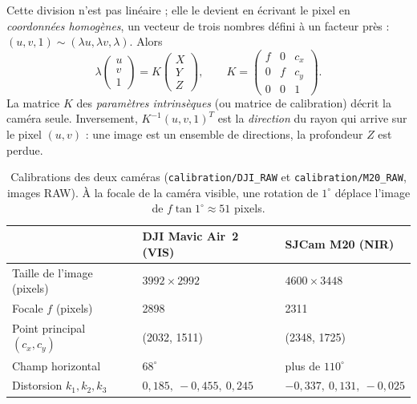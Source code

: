 \documentclass[a4paper,11pt]{report}
\begin{document}
Cette division n'est pas linéaire ; elle le devient en écrivant le pixel en \emph{coordonnées homogènes}, un vecteur de trois nombres défini à un facteur près : $(u, v, 1) \sim (\lambda u, \lambda v, \lambda)$. Alors
\begin{equation}\label{eq:ann_pinhole}
	\lambda \begin{pmatrix} u \\ v \\ 1 \end{pmatrix} = K \begin{pmatrix} X \\ Y \\ Z \end{pmatrix},
	\qquad
	K = \begin{pmatrix} f & 0 & c_x \\ 0 & f & c_y \\ 0 & 0 & 1 \end{pmatrix}.
\end{equation}
La matrice $K$ des \emph{paramètres intrinsèques} (ou matrice de calibration) décrit la caméra seule. Inversement, $K^{-1}(u, v, 1)^T$ est la \emph{direction} du rayon qui arrive sur le pixel $(u,v)$ : une image est un ensemble de directions, la profondeur $Z$ est perdue.

\begin{table}[htbp]\centering
\begin{tabular}{@{}lll@{}}
\hline
 & \textbf{DJI Mavic Air~2 (VIS)} & \textbf{SJCam M20 (NIR)} \\ \hline
Taille de l'image (pixels) & $3992 \times 2992$ & $4600 \times 3448$ \\
Focale $f$ (pixels) & 2898 & 2311 \\
Point principal $(c_x, c_y)$ & (2032, 1511) & (2348, 1725) \\
Champ horizontal & $68^\circ$ & plus de $110^\circ$ \\
Distorsion $k_1, k_2, k_3$ & $0{,}185,\ -0{,}455,\ 0{,}245$ & $-0{,}337,\ 0{,}131,\ -0{,}025$ \\ \hline
\end{tabular}
\caption{Calibrations des deux caméras (\texttt{calibration/DJI\_RAW} et \texttt{calibration/M20\_RAW}, images RAW). À la focale de la caméra visible, une rotation de $1^\circ$ déplace l'image de $f \tan 1^\circ \approx 51$ pixels.}
\label{tab:ann_calib}
\end{table}
\end{document}
